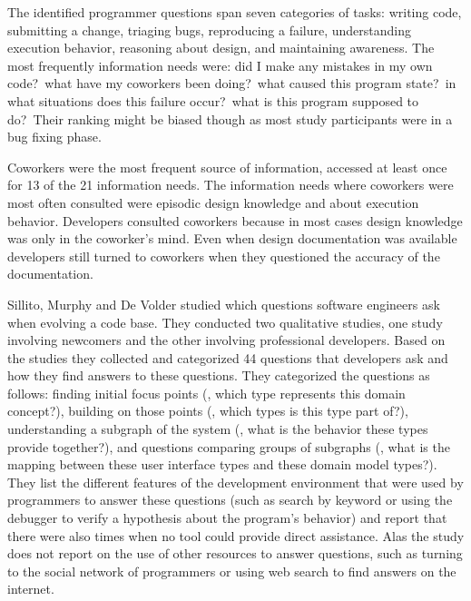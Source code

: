 The identified programmer questions span seven categories of tasks: writing code, submitting a change, triaging bugs, reproducing a failure, understanding execution behavior, reasoning about design, and maintaining awareness. The most frequently information needs were: did I make any mistakes in my own code?~what have my coworkers been doing?~what caused this program state?~in what situations does this failure occur?~what is this program supposed to do?~Their ranking might be biased though as most study participants were in a bug fixing phase. 

Coworkers were the most frequent source of information, accessed at least once for 13 of the 21 information needs. The information needs where coworkers were most often consulted were episodic design knowledge and about execution behavior. Developers consulted coworkers because in most cases design knowledge was only in the coworker's mind. Even when design documentation was available developers still turned to coworkers when they questioned the accuracy of the documentation.

Sillito, Murphy and De Volder \cite{Sill06a} studied which questions software engineers ask when evolving a code base. They conducted two qualitative studies, one study involving newcomers and the other involving professional developers. Based on the studies they collected and categorized 44 questions that developers ask and how they find answers to these questions. They categorized the questions as follows: finding initial focus points (\eg, which type represents this domain concept?), building on those points (\eg, which types is this type part of?), understanding a subgraph of the system (\eg, what is the behavior these types provide together?), and questions comparing groups of subgraphs (\eg, what is the mapping between these user interface types and these domain model types?). They list the different features of the development environment that were used by programmers to answer these questions (such as search by keyword or using the debugger to verify a hypothesis about the program's behavior) and report that there were also times when no tool could provide direct assistance. Alas the study does not report on the use of other resources to answer questions, such as turning to the social network of programmers or using web search to find answers on the internet. 

